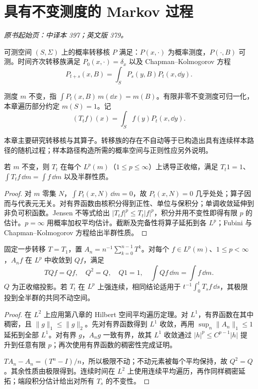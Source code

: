 \section{具有不变测度的 Markov 过程}\label{sec:yosida-13-01}
\noindent\textit{原书起始页：中译本 397；英文版 379。}

\begin{definition}[转移核]
可测空间 $(S,\Sigma)$ 上的概率转移核 $P$ 满足：$P(x,\cdot)$ 为概率测度，$P(\cdot,B)$ 可测。时间齐次转移族满足 $P_0(x,\cdot)=\delta_x$ 以及 Chapman--Kolmogorov 方程
\[
 P_{t+s}(x,B)=\int_S P_s(y,B)P_t(x,\dd y).
\]
\end{definition}

测度 $m$ 不变，指 $\int P_t(x,B)\,m(\dd x)=m(B)$。有限非零不变测度可归一化，本章遍历部分约定 $m(S)=1$。记
\[
 (T_tf)(x)=\int_S f(y)P_t(x,\dd y).
\]

本章主要研究转移核与其算子。转移族的存在不自动等于已构造出具有连续样本路径的随机过程；样本路径构造所需的概率空间与正则性应另外说明。

\begin{proposition}[Markov 收缩]\label{prop:y13-markov-contraction}
若 $m$ 不变，则 $T_t$ 在每个 $L^p(m)$（$1\le p\le\infty$）上诱导正收缩，满足 $T_t1=1$、$\int T_tf\,\dd m=\int f\,\dd m$ 以及半群性质。
\end{proposition}
\begin{proof}
对 $m$ 零集 $N$，$\int P_t(x,N)\,\dd m=0$，故 $P_t(x,N)=0$ 几乎处处；算子因而与代表元无关。对有界函数由核积分得到正性、单位与保积分；单调收敛延伸到非负可积函数。Jensen 不等式给出 $|T_tf|^p\le T_t|f|^p$，积分并用不变性即得有限 $p$ 的估计。$p=\infty$ 用概率加权平均估计。截断及完备性将算子延拓到各 $L^p$；Fubini 与 Chapman--Kolmogorov 方程给出半群性质。
\end{proof}

\begin{theorem}[有限不变测度下的平均遍历]\label{thm:y13-markov-mean}
固定一步转移 $T=T_1$，置 $A_n=n^{-1}\sum_{k=0}^{n-1}T^k$。对每个 $f\in L^p(m)$、$1\le p<\infty$，$A_nf$ 在 $L^p$ 中收敛到 $Qf$，满足
\[
 TQf=Qf,\quad Q^2=Q,\quad Q1=1,\quad
 \int Qf\,\dd m=\int f\,\dd m.
\]
$Q$ 为正收缩投影。若 $T_t$ 在 $L^p$ 上强连续，相同结论适用于 $t^{-1}\int_0^tT_sf\,\dd s$，其极限投到全半群的共同不动空间。
\end{theorem}
\begin{proof}
在 $L^2$ 上应用第八章的 Hilbert 空间平均遍历定理。对 $L^1$，有界函数在其中稠密，且 $\|g\|_1\le\|g\|_2$。先对有界函数得到 $L^1$ 收敛，再用 $\sup_n\|A_n\|_1\le1$ 延拓到全部 $L^1$。对有界 $g$，$A_ng$ 一致有界，故其 $L^1$ 收敛通过 $|h|^p\le C^{p-1}|h|$ 提升到任意有限 $p$；再次使用有界函数的稠密性完成证明。

$TA_n-A_n=(T^n-I)/n$，所以极限不动；不动元素被每个平均保持，故 $Q^2=Q$。其余性质由极限得到。连续时间在 $L^2$ 上使用连续平均遍历，再作同样稠密延拓；端段积分估计给出对所有 $T_s$ 的不变性。
\end{proof}

